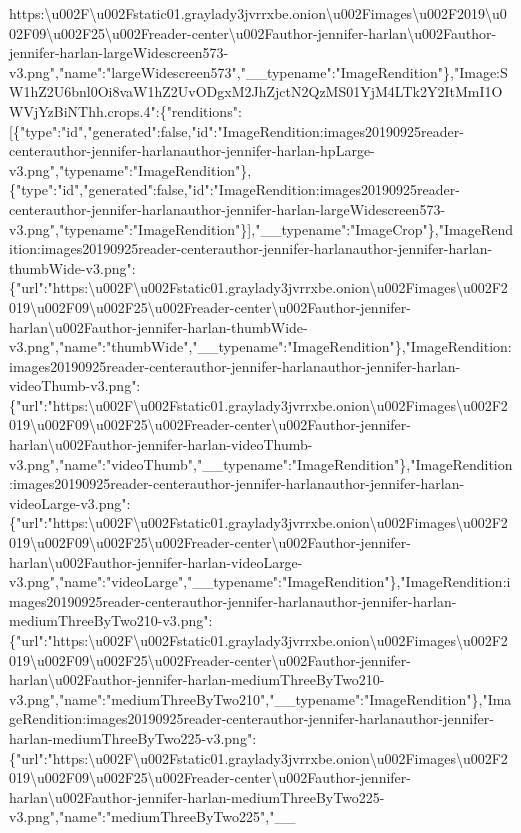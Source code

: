 https:\textbackslash{}u002F\textbackslash{}u002Fstatic01.graylady3jvrrxbe.onion\textbackslash{}u002Fimages\textbackslash{}u002F2019\textbackslash{}u002F09\textbackslash{}u002F25\textbackslash{}u002Freader-center\textbackslash{}u002Fauthor-jennifer-harlan\textbackslash{}u002Fauthor-jennifer-harlan-largeWidescreen573-v3.png","name":"largeWidescreen573","\_\_typename":"ImageRendition"\},"Image:SW1hZ2U6bnl0Oi8vaW1hZ2UvODgxM2JhZjctN2QzMS01YjM4LTk2Y2ItMmI1OWVjYzBiNThh.crops.4":\{"renditions":{[}\{"type":"id","generated":false,"id":"ImageRendition:images20190925reader-centerauthor-jennifer-harlanauthor-jennifer-harlan-hpLarge-v3.png","typename":"ImageRendition"\},\{"type":"id","generated":false,"id":"ImageRendition:images20190925reader-centerauthor-jennifer-harlanauthor-jennifer-harlan-largeWidescreen573-v3.png","typename":"ImageRendition"\}{]},"\_\_typename":"ImageCrop"\},"ImageRendition:images20190925reader-centerauthor-jennifer-harlanauthor-jennifer-harlan-thumbWide-v3.png":\{"url":"https:\textbackslash{}u002F\textbackslash{}u002Fstatic01.graylady3jvrrxbe.onion\textbackslash{}u002Fimages\textbackslash{}u002F2019\textbackslash{}u002F09\textbackslash{}u002F25\textbackslash{}u002Freader-center\textbackslash{}u002Fauthor-jennifer-harlan\textbackslash{}u002Fauthor-jennifer-harlan-thumbWide-v3.png","name":"thumbWide","\_\_typename":"ImageRendition"\},"ImageRendition:images20190925reader-centerauthor-jennifer-harlanauthor-jennifer-harlan-videoThumb-v3.png":\{"url":"https:\textbackslash{}u002F\textbackslash{}u002Fstatic01.graylady3jvrrxbe.onion\textbackslash{}u002Fimages\textbackslash{}u002F2019\textbackslash{}u002F09\textbackslash{}u002F25\textbackslash{}u002Freader-center\textbackslash{}u002Fauthor-jennifer-harlan\textbackslash{}u002Fauthor-jennifer-harlan-videoThumb-v3.png","name":"videoThumb","\_\_typename":"ImageRendition"\},"ImageRendition:images20190925reader-centerauthor-jennifer-harlanauthor-jennifer-harlan-videoLarge-v3.png":\{"url":"https:\textbackslash{}u002F\textbackslash{}u002Fstatic01.graylady3jvrrxbe.onion\textbackslash{}u002Fimages\textbackslash{}u002F2019\textbackslash{}u002F09\textbackslash{}u002F25\textbackslash{}u002Freader-center\textbackslash{}u002Fauthor-jennifer-harlan\textbackslash{}u002Fauthor-jennifer-harlan-videoLarge-v3.png","name":"videoLarge","\_\_typename":"ImageRendition"\},"ImageRendition:images20190925reader-centerauthor-jennifer-harlanauthor-jennifer-harlan-mediumThreeByTwo210-v3.png":\{"url":"https:\textbackslash{}u002F\textbackslash{}u002Fstatic01.graylady3jvrrxbe.onion\textbackslash{}u002Fimages\textbackslash{}u002F2019\textbackslash{}u002F09\textbackslash{}u002F25\textbackslash{}u002Freader-center\textbackslash{}u002Fauthor-jennifer-harlan\textbackslash{}u002Fauthor-jennifer-harlan-mediumThreeByTwo210-v3.png","name":"mediumThreeByTwo210","\_\_typename":"ImageRendition"\},"ImageRendition:images20190925reader-centerauthor-jennifer-harlanauthor-jennifer-harlan-mediumThreeByTwo225-v3.png":\{"url":"https:\textbackslash{}u002F\textbackslash{}u002Fstatic01.graylady3jvrrxbe.onion\textbackslash{}u002Fimages\textbackslash{}u002F2019\textbackslash{}u002F09\textbackslash{}u002F25\textbackslash{}u002Freader-center\textbackslash{}u002Fauthor-jennifer-harlan\textbackslash{}u002Fauthor-jennifer-harlan-mediumThreeByTwo225-v3.png","name":"mediumThreeByTwo225","\_\_